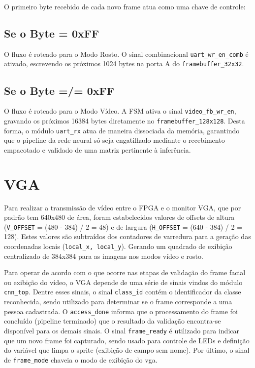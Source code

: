 O primeiro byte recebido de cada novo frame atua como uma chave de controle:
\subsection*{Se o Byte = 0xFF} O fluxo é roteado para o Modo Rosto. O sinal combinacional \texttt{uart\_wr\_en\_comb} é ativado, escrevendo os próximos 1024 bytes na porta A do \texttt{framebuffer\_32x32}.
\subsection*{Se o Byte =/= 0xFF} O fluxo é roteado para o Modo Vídeo. A FSM ativa o sinal \texttt{video\_fb\_wr\_en}, gravando os próximos 16384 bytes diretamente no \texttt{framebuffer\_128x128}.
Desta forma, o módulo \texttt{uart\_rx} atua de maneira dissociada da memória, garantindo que o pipeline da rede neural só seja engatilhado mediante o recebimento empacotado e validado de uma matriz pertinente à inferência.


\section{VGA}
Para realizar a transmissão de vídeo entre o FPGA e o monitor VGA, que por padrão tem 640x480 de área, foram estabelecidos valores de offsets de altura (\texttt{V\_OFFSET} = (480 - 384) / 2 = 48) e de largura (\texttt{H\_OFFSET} = (640 - 384) / 2 = 128). Estes valores são subtraídos dos contadores de varredura para a geração das coordenadas locais (\texttt{local\_x, local\_y}). Gerando um quadrado de exibição centralizado de 384x384 para as imagens nos modos vídeo e rosto.

Para operar de acordo com o que ocorre nas etapas de validação do frame facial ou exibição do vídeo, o VGA depende de uma série de sinais vindos do módulo \texttt{cnn\_top}. Dentre esses sinais, o sinal \texttt{class\_id} contém o identificador da classe reconhecida, sendo utilizado para determinar se o frame corresponde a uma pessoa cadastrada. O \texttt{access\_done} informa que o processamento do frame foi concluído (pipeline terminado) que o resultado da validação encontra-se disponível para os demais sinais. O sinal \texttt{frame\_ready} é utilizado para indicar que um novo frame foi capturado, sendo usado para controle de LEDs e definição do variável que limpa o sprite (exibição de campo sem nome). Por último, o sinal de \texttt{frame\_mode} chaveia o modo de exibição do vga. 


